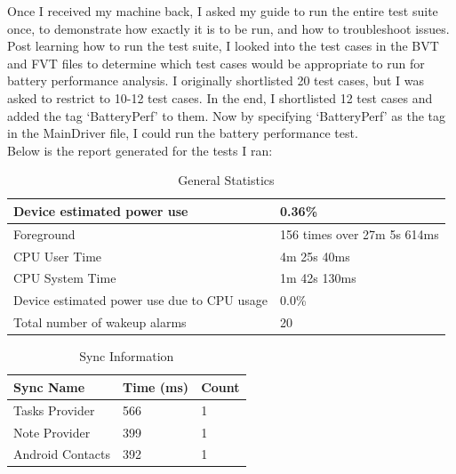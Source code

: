 Once I received my machine back, I asked my guide to run the entire test suite once, to demonstrate how exactly it is to be run, and how to troubleshoot issues. \\

Post learning how to run the test suite, I looked into the test cases in the BVT and FVT files to determine which test cases would be appropriate to run for battery performance analysis. I originally shortlisted 20 test cases, but I was asked to restrict to 10-12 test cases. In the end, I shortlisted 12 test cases and added the tag `BatteryPerf' to them. Now by specifying `BatteryPerf' as the tag in the MainDriver file, I could run the battery performance test.\\

Below is the report generated for the tests I ran:

\begin{table}[!h]
\begin{center}
\caption{General Statistics}
\label{my-label}
\begin{tabular}{|P{8cm}|P{6.5cm}|}
\hline
Device estimated power use                  & 0.36\%                      \\ \hline
Foreground                                  & 156 times over 27m 5s 614ms \\ \hline
CPU User Time                               & 4m 25s 40ms                 \\ \hline
CPU System Time                             & 1m 42s 130ms                \\ \hline
Device estimated power use due to CPU usage & 0.0\%                       \\ \hline
Total number of wakeup alarms               & 20     \\    \hline                
\end{tabular}
\end{center}
\end{table}

\begin{table}[!h]
\begin{center}
\caption{Sync Information}
\label{my-label}
\begin{tabular}{|P{4cm}|P{4cm}|P{4cm}|}
\hline
Sync Name        & Time (ms) & Count \\ \hline
Tasks Provider   & 566       & 1     \\ \hline
Note Provider    & 399       & 1     \\ \hline
Android Contacts & 392       & 1    \\ \hline
\end{tabular}
\end{center}
\end{table}
\pagebreak

